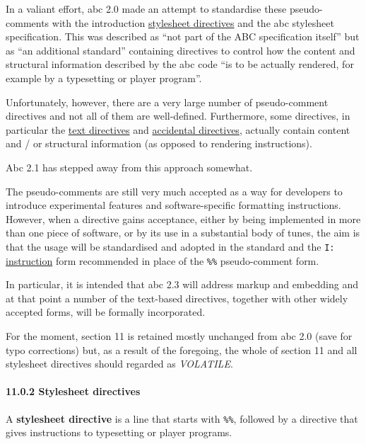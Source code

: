 In a valiant effort, abc 2.0 made an attempt to standardise these
pseudo-comments with the introduction
\protect\hyperlink{stylesheet_directive_definition}{stylesheet
directives} and the abc stylesheet specification. This was described as
``not part of the ABC specification itself'' but as ``an additional
standard'' containing directives to control how the content and
structural information described by the abc code ``is to be actually
rendered, for example by a typesetting or player program''.

Unfortunately, however, there are a very large number of pseudo-comment
directives and not all of them are well-defined. Furthermore, some
directives, in particular the \protect\hyperlink{text_directives}{text
directives} and \protect\hyperlink{accidental_directives}{accidental
directives}, actually contain content and / or structural information
(as opposed to rendering instructions).

Abc 2.1 has stepped away from this approach somewhat.

The pseudo-comments are still very much accepted as a way for developers
to introduce experimental features and software-specific formatting
instructions. However, when a directive gains acceptance, either by
being implemented in more than one piece of software, or by its use in a
substantial body of tunes, the aim is that the usage will be
standardised and adopted in the standard and the \texttt{I:}
\protect\hyperlink{iinstruction}{instruction} form recommended in place
of the \texttt{\%\%} pseudo-comment form.

In particular, it is intended that abc 2.3 will address markup and
embedding and at that point a number of the text-based directives,
together with other widely accepted forms, will be formally
incorporated.

For the moment, section 11 is retained mostly unchanged from abc 2.0
(save for typo corrections) but, as a result of the foregoing, the whole
of section 11 and all stylesheet directives should regarded as
\emph{VOLATILE}.

\hypertarget{stylesheet_directives}{\paragraph{11.0.2 Stylesheet
directives}\label{stylesheet_directives}}

\href{}{}A \textbf{stylesheet directive} is a line that starts with
\texttt{\%\%}, followed by a directive that gives instructions to
typesetting or player programs.

